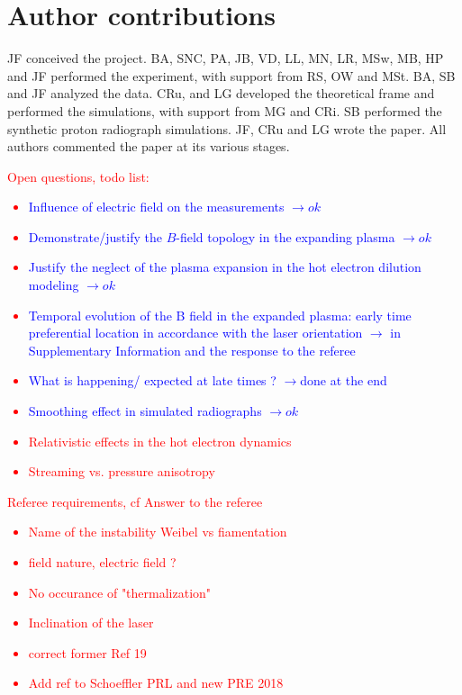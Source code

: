 \documentclass[aps,twocolumn,showpacs,superscriptaddress]{revtex4}
\begin{document}
\section*{Author contributions}
JF conceived the project. BA, SNC, PA, JB, VD, LL, MN, LR, MSw, MB, HP and JF performed the experiment, with support from RS, OW and MSt.  BA, SB and JF analyzed the data. CRu, and LG developed the theoretical frame and performed the simulations, with support from MG and CRi. SB performed the synthetic proton radiograph simulations. JF, CRu and LG wrote the paper. All authors commented the paper at its various stages.

\textcolor{red}{
Open questions, todo list:
\begin{itemize}
\item \textcolor{blue}{ Influence of electric field on the measurements $\rightarrow ok $ }
\item \textcolor{blue}{ Demonstrate/justify the $B$-field topology in the expanding plasma $\rightarrow ok $ }
\item \textcolor{blue}{Justify the neglect of the plasma expansion in the hot electron dilution modeling $\rightarrow ok $ }
\item  \textcolor{blue}{ Temporal evolution of the B field in the expanded plasma: early time preferential location in accordance with the laser orientation $\rightarrow$ in Supplementary Information and the response to the referee}
\item  \textcolor{blue}{ What is happening/ expected at late times ? $\rightarrow $done at the end }
\item  \textcolor{blue}{ Smoothing effect in simulated radiographs $\rightarrow ok $}
\item Relativistic effects in the hot electron dynamics
\item Streaming vs. pressure anisotropy
\end{itemize}
}

\textcolor{red}{
Referee requirements, cf Answer to the referee
\begin{itemize}
\item Name of the instability Weibel vs fiamentation
\item field nature, electric field ?
\item No occurance of "thermalization"
\item Inclination of the laser
\item correct former Ref 19
\item Add ref to Schoeffler PRL and new PRE 2018
\end{itemize}
}
\end{document}
